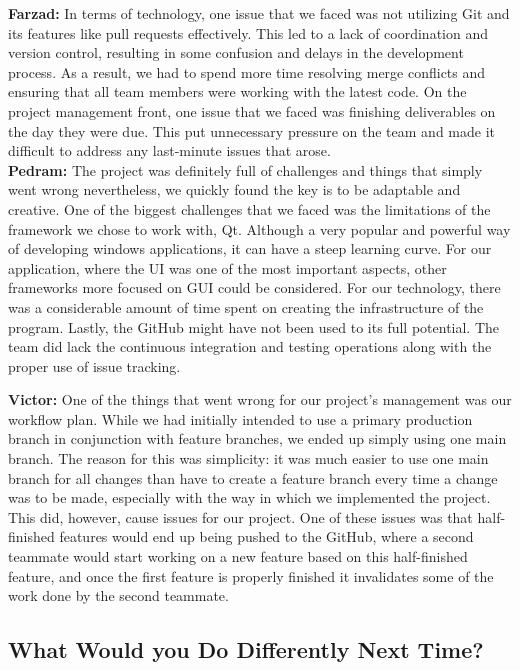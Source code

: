 \documentclass{article}
\begin{document}
\textbf{Farzad:} In terms of technology, one issue that we faced was not utilizing Git and its features like pull requests effectively. This led to a lack of coordination and version control, resulting in some confusion and delays in the development process. As a result, we had to spend more time resolving merge conflicts and ensuring that all team members were working with the latest code. On the project management front, one issue that we faced was finishing deliverables on the day they were due. This put unnecessary pressure on the team and made it difficult to address any last-minute issues that arose.\\

\textbf{Pedram:} The project was definitely full of challenges and things that simply went wrong nevertheless, we quickly found the key is to be adaptable and creative. One of the biggest challenges that we faced was the limitations of the framework we chose to work with, Qt. Although a very popular and powerful way of developing windows applications, it can have a steep learning curve. For our application, where the UI was one of the most important aspects, other frameworks more focused on GUI could be considered. For our technology, there was a considerable amount of time spent on creating the infrastructure of the program. Lastly, the GitHub might have not been used to its full potential. The team did lack the continuous integration and testing operations along with the proper use of issue tracking. 

\textbf{Victor:} One of the things that went wrong for our project's management was our workflow plan. While we had initially intended to use a primary production branch in 
conjunction with feature branches, we ended up simply using one main branch. The reason for this was simplicity: it was much easier to use one main branch for all changes than
have to create a feature branch every time a change was to be made, especially with the way in which we implemented the project. This did, however, cause issues for our project.
One of these issues was that half-finished features would end up being pushed to the GitHub, where a second teammate would start working on a new feature based on this 
half-finished feature, and once the first feature is properly finished it invalidates some of the work done by the second teammate.

\subsection{What Would you Do Differently Next Time?}
\end{document}
